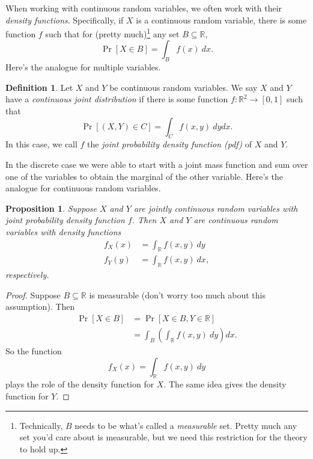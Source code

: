 \documentclass[12pt]{article}
\theoremstyle{plain}
\newtheorem{proposition}[theorem]{Proposition}
\theoremstyle{definition}
\newtheorem{definition}[theorem]{Definition}
\theoremstyle{remark}
\newcommand{\R}{\mathbb{R}}
\begin{document}
When working with continuous random variables, we often work with their \emph{density functions}.
Specifically, if $X$ is a continuous random variable, there is some function $f$ such that for (pretty much)\footnote{Technically, $B$ needs to be what's called a \emph{measurable} set. Pretty much any set you'd care about is measurable, but we need this restriction for the theory to hold up.} any set $B\subseteq \R$,
\[
    \Pr[X\in B] = \int_Bf(x)\ dx.
\]
Here's the analogue for multiple variables.

\begin{definition}
    Let $X$ and $Y$ be continuous random variables.
    We say $X$ and $Y$ have a \emph{continuous joint distribution} if there is some function $f: \R^2\to [0,1]$ such that
    \[
        \Pr[(X,Y)\in C] = \int_Cf(x,y)\ dydx.
    \]
    In this case, we call $f$ the \emph{joint probability density function (pdf)} of $X$ and $Y$.
\end{definition}

In the discrete case we were able to start with a joint mass function and sum over one of the variables to obtain the marginal of the other variable.
Here's the analogue for continuous random variables.

\begin{proposition}
    Suppose $X$ and $Y$ are jointly continuous random variables with joint probability density function $f$.
    Then $X$ and $Y$ are continuous random variables with density functions
    \begin{align*}
        f_X(x) &= \int_\R f(x,y)\ dy\\
        f_Y(y) &= \int_\R f(x,y)\ dx,
    \end{align*}
    respectively.
\end{proposition}
\begin{proof}
    Suppose $B\subseteq \R$ is measurable (don't worry too much about this assumption).
    Then
    \begin{align*}
        \Pr[X\in B] &= \Pr[X\in B, Y\in \R]\\
        &= \int_B\left(\int_\R f(x,y)\ dy\right)dx.
    \end{align*}
    So the function
    \[
        f_X(x) = \int_\R f(x,y)\ dy
    \]
    plays the role of the density function for $X$.
    The same idea gives the density function for $Y$.
\end{proof}
\end{document}

